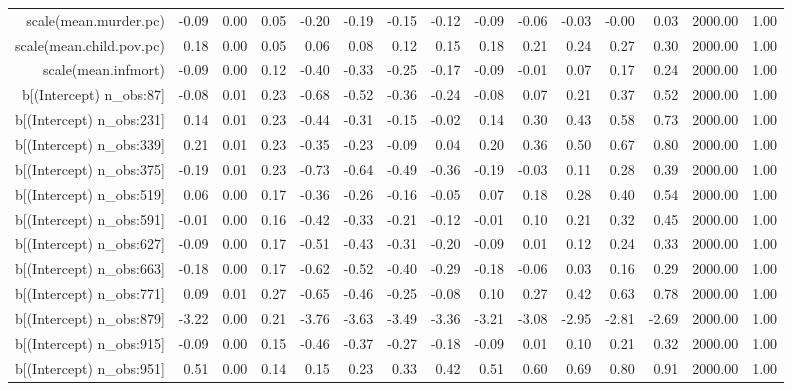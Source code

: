 \begin{table}[ht]
\begin{tabular}{rrrrrrrrrrrrrrr}
  scale(mean.murder.pc) & -0.09 & 0.00 & 0.05 & -0.20 & -0.19 & -0.15 & -0.12 & -0.09 & -0.06 & -0.03 & -0.00 & 0.03 & 2000.00 & 1.00 \\ 
  scale(mean.child.pov.pc) & 0.18 & 0.00 & 0.05 & 0.06 & 0.08 & 0.12 & 0.15 & 0.18 & 0.21 & 0.24 & 0.27 & 0.30 & 2000.00 & 1.00 \\ 
  scale(mean.infmort) & -0.09 & 0.00 & 0.12 & -0.40 & -0.33 & -0.25 & -0.17 & -0.09 & -0.01 & 0.07 & 0.17 & 0.24 & 2000.00 & 1.00 \\ 
  b[(Intercept) n\_obs:87] & -0.08 & 0.01 & 0.23 & -0.68 & -0.52 & -0.36 & -0.24 & -0.08 & 0.07 & 0.21 & 0.37 & 0.52 & 2000.00 & 1.00 \\ 
  b[(Intercept) n\_obs:231] & 0.14 & 0.01 & 0.23 & -0.44 & -0.31 & -0.15 & -0.02 & 0.14 & 0.30 & 0.43 & 0.58 & 0.73 & 2000.00 & 1.00 \\ 
  b[(Intercept) n\_obs:339] & 0.21 & 0.01 & 0.23 & -0.35 & -0.23 & -0.09 & 0.04 & 0.20 & 0.36 & 0.50 & 0.67 & 0.80 & 2000.00 & 1.00 \\ 
  b[(Intercept) n\_obs:375] & -0.19 & 0.01 & 0.23 & -0.73 & -0.64 & -0.49 & -0.36 & -0.19 & -0.03 & 0.11 & 0.28 & 0.39 & 2000.00 & 1.00 \\ 
  b[(Intercept) n\_obs:519] & 0.06 & 0.00 & 0.17 & -0.36 & -0.26 & -0.16 & -0.05 & 0.07 & 0.18 & 0.28 & 0.40 & 0.54 & 2000.00 & 1.00 \\ 
  b[(Intercept) n\_obs:591] & -0.01 & 0.00 & 0.16 & -0.42 & -0.33 & -0.21 & -0.12 & -0.01 & 0.10 & 0.21 & 0.32 & 0.45 & 2000.00 & 1.00 \\ 
  b[(Intercept) n\_obs:627] & -0.09 & 0.00 & 0.17 & -0.51 & -0.43 & -0.31 & -0.20 & -0.09 & 0.01 & 0.12 & 0.24 & 0.33 & 2000.00 & 1.00 \\ 
  b[(Intercept) n\_obs:663] & -0.18 & 0.00 & 0.17 & -0.62 & -0.52 & -0.40 & -0.29 & -0.18 & -0.06 & 0.03 & 0.16 & 0.29 & 2000.00 & 1.00 \\ 
  b[(Intercept) n\_obs:771] & 0.09 & 0.01 & 0.27 & -0.65 & -0.46 & -0.25 & -0.08 & 0.10 & 0.27 & 0.42 & 0.63 & 0.78 & 2000.00 & 1.00 \\ 
  b[(Intercept) n\_obs:879] & -3.22 & 0.00 & 0.21 & -3.76 & -3.63 & -3.49 & -3.36 & -3.21 & -3.08 & -2.95 & -2.81 & -2.69 & 2000.00 & 1.00 \\ 
  b[(Intercept) n\_obs:915] & -0.09 & 0.00 & 0.15 & -0.46 & -0.37 & -0.27 & -0.18 & -0.09 & 0.01 & 0.10 & 0.21 & 0.32 & 2000.00 & 1.00 \\ 
  b[(Intercept) n\_obs:951] & 0.51 & 0.00 & 0.14 & 0.15 & 0.23 & 0.33 & 0.42 & 0.51 & 0.60 & 0.69 & 0.80 & 0.91 & 2000.00 & 1.00 \\ 

\end{tabular}
\end{table}
